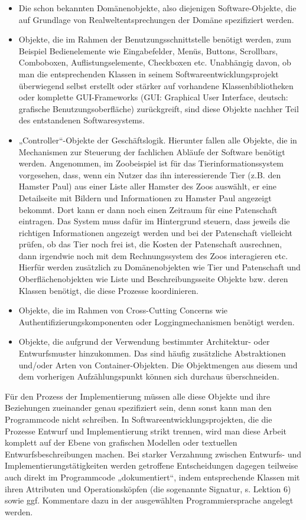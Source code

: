 \begin{itemize}
	\item Die schon bekannten Domänenobjekte, also diejenigen Software-Objekte, die auf Grundlage von Realweltentsprechungen der Domäne spezifiziert werden.
	\item Objekte, die im Rahmen der Benutzungsschnittstelle benötigt werden, zum Beispiel Bedienelemente wie Eingabefelder, Menüs, Buttons, Scrollbars, Comboboxen, Auflistungselemente, Checkboxen etc. Unabhängig davon, ob man die entsprechenden Klassen in seinem Softwareentwicklungsprojekt über\-wiegend selbst erstellt oder stärker auf vorhandene Klassenbibliotheken oder komplette GUI-Frameworks (GUI: Graphical User Interface, deutsch: grafische 
	\linebreak %
	Benutzungs\-oberfläche) zurückgreift, sind diese Objekte nachher Teil des entstandenen Softwaresystems.
	\item „Controller“-Objekte der Geschäftslogik. Hierunter fallen alle Objekte, die in Mechanismen zur Steuerung der fachlichen Abläufe der Software benötigt werden. Angenommen, im Zoobeispiel ist für das Tierinformationssystem vor\-gesehen, dass, wenn ein Nutzer das ihn interessierende Tier (z.B. den Hamster Paul) aus einer Liste aller Hamster des Zoos auswählt, er eine Detailseite mit Bildern und Informationen zu Hamster Paul angezeigt bekommt. Dort kann er dann noch einen Zeitraum für eine Patenschaft eintragen. Das System muss dafür im Hintergrund steuern, dass jeweils die richtigen \mbox{Informationen} \mbox{angezeigt} werden und bei der Patenschaft vielleicht prüfen, ob das Tier noch frei ist, die Kosten der Patenschaft ausrechnen, dann irgendwie noch mit dem Rechnungssystem des Zoos interagieren etc. Hierfür werden zusätzlich zu Domänen\-objekten wie Tier und Patenschaft und Oberflächenobjekten wie Liste und Beschreibungsseite Objekte bzw. deren Klassen benötigt, die diese Prozesse koordinieren.
	\item Objekte, die im Rahmen von Cross-Cutting Concerns wie Authentifizierungskomponenten oder Loggingmechanismen benötigt werden.
	\item Objekte, die aufgrund der Verwendung bestimmter Architektur- oder Entwurfs\-muster hinzukommen. Das sind häufig zusätzliche Abstraktionen und/oder Arten von Container-Objekten. Die Objektmengen aus diesem und dem vorherigen Aufzählungspunkt können sich durchaus überschneiden.
\end{itemize}
  
Für den Prozess der Implementierung müssen alle diese Objekte und ihre Beziehungen zueinander genau spezifiziert sein, denn sonst kann man den Programmcode nicht schreiben. In Softwareentwicklungsprojekten, die die Prozesse Entwurf und Implementierung strikt trennen, wird man diese Arbeit komplett auf der Ebene von grafischen Modellen oder textuellen Entwurfsbeschreibungen machen. Bei starker Verzahnung zwischen Entwurfs- und Implementierungstätigkeiten werden getroffene Entscheidungen dagegen teilweise auch direkt im Programmcode „dokumentiert“, indem entsprechende Klassen mit ihren Attributen und Operationsköpfen (die sogenannte Signatur, s. Lektion 6) sowie ggf. Kommentare dazu in der ausgewählten Programmiersprache angelegt werden.

